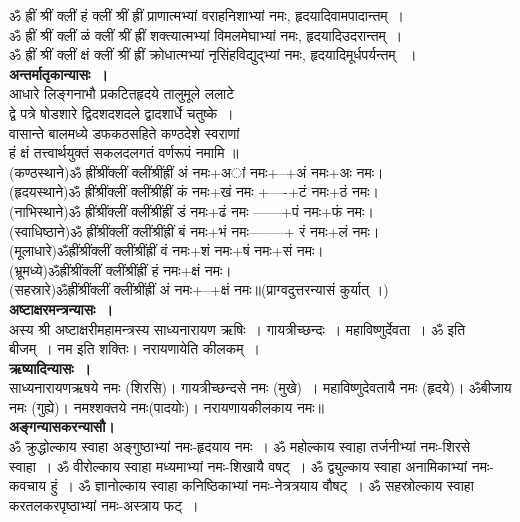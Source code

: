 \documentclass[twoside,top=1.7cm, bottom=1.7cm, outer=1cm,landscape, inner=1.5cm,a5paper,]{book}
\begin{document}
ॐ ह्रीं श्रीं क्लीं हं क्लीं श्रीं ह्रीं प्राणात्मभ्यां वराहनिशाभ्यां नमः, हृदयादिवामपादान्तम्~।\\
ॐ ह्रीं श्रीं क्लीं ळं क्लीं श्रीं ह्रीं शक्त्यात्मभ्यां विमलमेघाभ्यां नमः, हृदयादिउदरान्तम्~।\\
ॐ ह्रीं श्रीं क्लीं क्षं क्लीं श्रीं ह्रीं क्रोधात्मभ्यां नृसिंहविद्युद्भ्यां नमः, हृदयादिमूर्धपर्यन्तम् ~।\\[10pt]
{\bfseries अन्तर्मातृकान्यासः~।}\\
आधारे लिङ्गनाभौ प्रकटितहृदये तालुमूले ललाटे\\
     द्वे पत्रे षोडशारे द्विदशदशदले द्वादशार्धे चतुष्के~।\\
वासान्ते बालमध्ये डफकठसहिते कण्ठदेशे स्वराणां\\
     हं क्षं तत्त्वार्थयुक्तं सकलदलगतं वर्णरूपं नमामि ॥\\
(कण्ठस्थाने)ॐ ह्रींश्रींक्लीं क्लींश्रींह्रीं अं नमः+अां नमः+--+अं नमः+अः नमः।\\
(हृदयस्थाने)ॐ ह्रींश्रींक्लीं क्लींश्रींह्रीं कं नमः+खं नमः +----+टं नमः+ठं नमः।\\
(नाभिस्थाने)ॐ ह्रींश्रींक्लीं क्लींश्रींह्रीं डं नमः+ढं नमः ------+पं नमः+फं नमः। \\
(स्वाधिष्ठाने)ॐ ह्रींश्रींक्लीं क्लींश्रींह्रीं बं नमः+भं नमः--------+ रं नमः+लं नमः। \\
(मूलाधारे)ॐह्रींश्रींक्लीं क्लींश्रींह्रीं वं नमः+शं नमः+षं नमः+सं नमः।\\
(भ्रूमध्ये)ॐह्रींश्रींक्लीं क्लींश्रींह्रीं हं नमः+क्षं नमः।\\
(सहस्रारे)ॐह्रींश्रींक्लीं क्लींश्रींह्रीं अं नमः+--+क्षं नमः॥(प्राग्वदुत्तरन्यासं कुर्यात् ।)\\
{\bfseries अष्टाक्षरमन्त्रन्यासः~।}\\
अस्य श्री अष्टाक्षरीमहामन्त्रस्य साध्यनारायण ऋषिः~। गायत्रीच्छन्दः~। महाविष्णुर्देवता~। ॐ इति बीजम्~। नम इति शक्तिः। नरायणायेति कीलकम्~।\\
{\bfseries ऋष्यादिन्यासः~।}\\
साध्यनारायणऋषये नमः (शिरसि)। गायत्रीच्छन्दसे नमः (मुखे)~। महाविष्णुदेवतायै नमः (हृदये)। ॐबीजाय नमः (गुह्ये)। नमश्शक्तये नमः(पादयोः)।
नरायणायकीलकाय नमः॥\\
{\bfseries अङ्गन्यासकरन्यासौ।}\\
ॐ क्रुद्धोल्काय स्वाहा अङ्गुष्ठाभ्यां नमः-हृदयाय नमः~। 
ॐ महोल्काय स्वाहा तर्जनीभ्यां नमः-शिरसे स्वाहा~।
ॐ वीरोल्काय स्वाहा मध्यमाभ्यां नमः-शिखायै वषट्~।
ॐ द्व्युल्काय स्वाहा अनामिकाभ्यां नमः-कवचाय हुं~।
ॐ ज्ञानोल्काय स्वाहा कनिष्ठिकाभ्यां नमः-नेत्रत्रयाय वौषट्~।
ॐ सहस्रोल्काय स्वाहा करतलकरपृष्ठाभ्यां नमः-अस्त्राय फट्~।\\[10pt]
\end{document}
